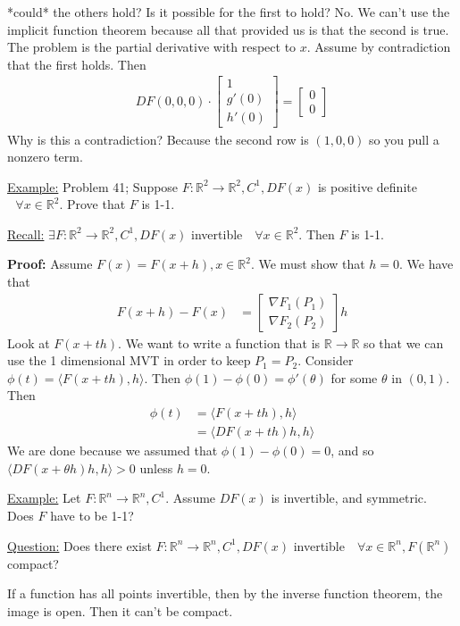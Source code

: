 \documentclass{article}
\newcommand*{\txt}[1]{\text{ #1 }}%
\newcommand*{\iprod}[1]{\langle #1 \rangle}
\newcommand*{\fora}{\txt{}\forall}%
\newcommand*{\rr}{\mathbb{R}}%
\begin{document}
*could* the others hold? Is it possible for the first to hold? No. We can't use the implicit function theorem because all that provided us is that the second is true. The problem is the partial derivative with respect to $x$. Assume by contradiction that the first holds. Then \begin{align*}
    DF(0,0,0)\cdot\begin{bmatrix}
        1\\
        g'(0)\\
        h'(0)
    \end{bmatrix}=\begin{bmatrix}
        0\\
        0
    \end{bmatrix}
\end{align*} Why is this a contradiction? Because the second row is $(1,0,0)$ so you pull a nonzero term. 

\underline{Example:} Problem 41; Suppose $F:\rr^2\to \rr^2, C^1, DF(x)$ is positive definite $\fora x\in \rr^2$. Prove that $F$ is 1-1.

\underline{Recall:} $\exists F:\rr^2\to \rr^2, C^1, DF(x)$ invertible $\fora x\in \rr^2$. Then $F$ is 1-1.

\textbf{Proof:} Assume $F(x)=F(x+h), x\in \rr^2$. We must show that $h=0$. We have that \begin{align*}
    F(x+h)-F(x)&=\begin{bmatrix}
        \nabla F_1(P_1)\\
        \nabla F_2(P_2)
    \end{bmatrix}h
\end{align*}Look at $F(x+th)$. We want to write a function that is $\rr\to\rr$ so that we can use the 1 dimensional MVT in order to keep $P_1=P_2$. Consider $\phi(t)=\iprod{F(x+th),h}$. Then $\phi(1)-\phi(0)=\phi'(\theta)$ for some $\theta$ in $(0,1)$. Then \begin{align*}
    \phi(t)&=\iprod{F(x+th),h}\\
    &=\iprod{DF(x+th)h,h}
\end{align*} We are done because we assumed that $\phi(1)-\phi(0)=0$, and so $\iprod{DF(x+\theta h)h,h}>0$ unless $h=0$. 

\underline{Example:} Let $F:\rr^n\to \rr^n, C^1$. Assume $DF(x)$ is invertible, and symmetric. Does $F$ have to be 1-1? 

\underline{Question:} Does there exist $F:\rr^n\to \rr^n, C^1, DF(x)$ invertible $\fora x\in \rr^n, F(\rr^n)$ compact? 

If a function has all points invertible, then by the inverse function theorem, the image is open. Then it can't be compact. 
\end{document}
